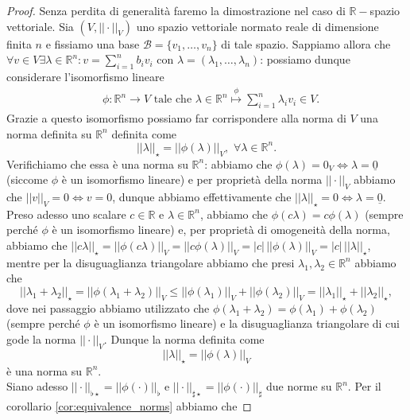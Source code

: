 \begin{proof}
    Senza perdita di generalità faremo la dimostrazione nel caso di $\mathbb{R}-$spazio vettoriale. Sia $(V, ||\cdot||_V)$ uno spazio vettoriale normato reale di dimensione finita $n$ e fissiamo una base $\mathcal{B} = \{ v_1, \ldots, v_n \}$ di tale spazio.
    Sappiamo allora che $\forall v \in V \exists \lambda \in \mathbb{R}^n : v = \sum_{i=1}^n b_i v_i$ con $\lambda = (\lambda_1, \ldots, \lambda_n)$: possiamo dunque considerare l'isomorfismo lineare
    \begin{align*}
        &\phi: \mathbb{R}^n \to V \, \, \text{tale che} \, \, \lambda \in \mathbb{R}^n \stackrel{\phi}{\mapsto} \sum_{i=1}^n \lambda_i v_i \in V.
    \end{align*}
    Grazie a questo isomorfismo possiamo far corrispondere alla norma di $V$ una norma definita su $\mathbb{R}^n$ definita come
    $$
    ||\lambda||_{\star} = ||\phi(\lambda)||_V, \, \, \forall \lambda \in \mathbb{R}^n.
    $$
    Verifichiamo che essa è una norma su $\mathbb{R}^n$: abbiamo che $\phi(\lambda) = 0_V \iff \lambda = \underline{0}$ (siccome $\phi$ è un isomorfismo lineare) e per proprietà della norma $||\cdot||_V$ abbiamo che $||v||_V = 0 \iff v = 0$, dunque abbiamo effettivamente che $||\lambda||_{\star} = 0 \iff \lambda = \underline{0}$. Preso adesso uno scalare $c \in \mathbb{R}$ e $\lambda \in \mathbb{R}^n$, abbiamo che
    $\phi(c\lambda) = c\phi(\lambda)$ (sempre perché $\phi$ è un isomorfismo lineare) e, per proprietà di omogeneità della norma, abbiamo che $||c\lambda||_{\star} = ||\phi(c\lambda)||_V = ||c \phi(\lambda) ||_V = |c| \, ||\phi(\lambda)||_V = |c| \, ||\lambda||_{\star}$, mentre per la disuguaglianza triangolare abbiamo che presi $\lambda_1, \lambda_2 \in \mathbb{R}^n$ abbiamo che
    $$
        ||\lambda_1 + \lambda_2||_{\star} = ||\phi(\lambda_1 + \lambda_2)||_V \leq ||\phi(\lambda_1)||_V + ||\phi(\lambda_2)||_V = ||\lambda_1||_{\star} + ||\lambda_2||_{\star},
    $$
    dove nei passaggio abbiamo utilizzato che $\phi(\lambda_1 + \lambda_2) = \phi(\lambda_1) + \phi(\lambda_2)$ (sempre perché $\phi$ è un isomorfismo lineare) e la disuguaglianza triangolare di cui gode la norma $||\cdot||_V$. Dunque la norma definita come
    $$
        ||\lambda||_{\star} = ||\phi(\lambda)||_V
    $$
    è una norma su $\mathbb{R}^n$. \\
    Siano adesso $||\cdot||_{\flat\star} = ||\phi(\cdot)||_{\flat}$ e $||\cdot||_{\sharp\star} = ||\phi(\cdot)||_{\sharp}$ due norme su $\mathbb{R}^n$. Per il corollario \ref{cor:equivalence_norms} abbiamo che

\end{proof}
